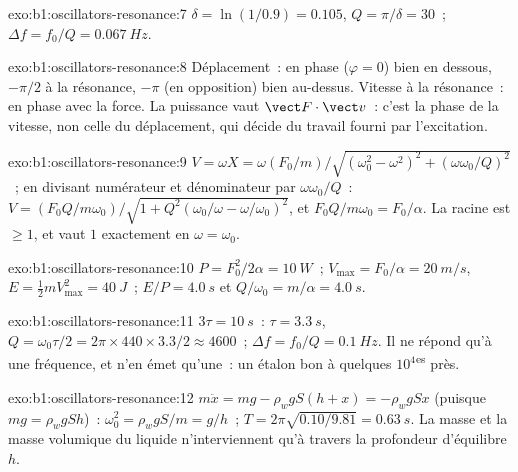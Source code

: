 \begin{solution}{exo:b1:oscillators-resonance:7}
$\delta = \ln(1/0.9) = 0.105$, $Q = \pi/\delta = 30$~; $\Delta f = f_0/Q =
\qty{0.067}{Hz}$.
\end{solution}

\begin{solution}{exo:b1:oscillators-resonance:8}
Déplacement~: en phase ($\varphi = 0$) bien en dessous, $-\pi/2$ à la
résonance, $-\pi$ (en opposition) bien au-dessus. Vitesse à la
résonance~: en phase avec la force. La puissance vaut $\vect F\cdot\vect v$~:
c'est la phase de la vitesse, non celle du déplacement, qui décide du
travail fourni par l'excitation.
\end{solution}

\begin{solution}{exo:b1:oscillators-resonance:9}
$V = \omega X = \omega(F_0/m)/\sqrt{(\omega_0^2 - \omega^2)^2 + (\omega\omega_0/Q)^2}$~;
en divisant numérateur et dénominateur par $\omega\omega_0/Q$~: $V = (F_0Q/m\omega_0)/
\sqrt{1 + Q^2(\omega_0/\omega - \omega/\omega_0)^2}$, et $F_0Q/m\omega_0 = F_0/\alpha$.
La racine est $\geq 1$, et vaut $1$ exactement en $\omega = \omega_0$.
\end{solution}

\begin{solution}{exo:b1:oscillators-resonance:10}
$P = F_0^2/2\alpha = \qty{10}{W}$~; $V_{\max} = F_0/\alpha = \qty{20}{m/s}$,
$E = \tfrac12 mV_{\max}^2 = \qty{40}{J}$~; $E/P = \qty{4.0}{s}$ et $Q/\omega_0 =
m/\alpha = \qty{4.0}{s}$.
\end{solution}

\begin{solution}{exo:b1:oscillators-resonance:11}
$3\tau = \qty{10}{s}$~: $\tau = \qty{3.3}{s}$, $Q = \omega_0\tau/2 = 2\pi \times
440 \times 3.3/2 \approx 4600$~; $\Delta f = f_0/Q = \qty{0.1}{Hz}$. Il ne
répond qu'à une fréquence, et n'en émet qu'une~: un étalon bon à
quelques $10^4$\textsuperscript{es} près.
\end{solution}

\begin{solution}{exo:b1:oscillators-resonance:12}
$m\ddot x = mg - \rho_wgS(h + x) = -\rho_wgSx$ (puisque $mg = \rho_wgSh$)~:
$\omega_0^2 = \rho_wgS/m = g/h$~; $T = 2\pi\sqrt{0.10/9.81} = \qty{0.63}{s}$.
La masse et la masse volumique du liquide n'interviennent qu'à travers
la profondeur d'équilibre $h$.
\end{solution}

